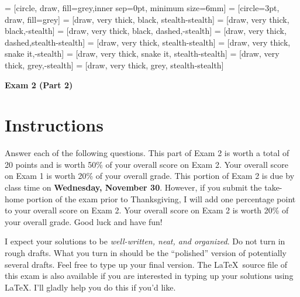 \documentclass[11pt]{article}
\theoremstyle{definition}
\begin{document}
 = [circle, draw, fill=grey,inner sep=0pt, minimum size=6mm]
 = [circle=3pt, draw, fill=grey]
 = [draw, very  thick, black, stealth-stealth]
 = [draw, very  thick, black,-stealth]
 = [draw, very  thick, black, dashed,-stealth]
 = [draw, very thick, dashed,stealth-stealth]
 = [draw, very thick, stealth-stealth]
 = [draw, very thick, snake it,-stealth]
 = [draw, very thick, snake it, stealth-stealth]
 = [draw, very thick, grey,-stealth]
 = [draw, very thick, grey, stealth-stealth]

\begin{center}

{\Large\bf Exam 2 (Part 2)}

\bigskip

  
  \bigskip
  

\end{center}

\section*{Instructions}

Answer each of the following questions. This part of Exam 2 is worth a total of 20 points and is worth 50\% of your overall score on Exam 2. Your overall score on Exam 1 is worth 20\% of your overall grade. This portion of Exam 2 is due by class time on \textbf{Wednesday, November 30}. However, if you submit the take-home portion of the exam prior to Thanksgiving, I will add one percentage point to your overall score on Exam 2. Your overall score on Exam 2 is worth 20\% of your overall grade. Good luck and have fun!

\bigskip

I expect your solutions to be \emph{well-written, neat, and organized}.  Do not turn in rough drafts.  What you turn in should be the ``polished'' version of potentially several drafts.  Feel free to type up your final version.  The \LaTeX\ source file of this exam is also available if you are interested in typing up your solutions using \LaTeX.  I'll gladly help you do this if you'd like.
\end{document}
